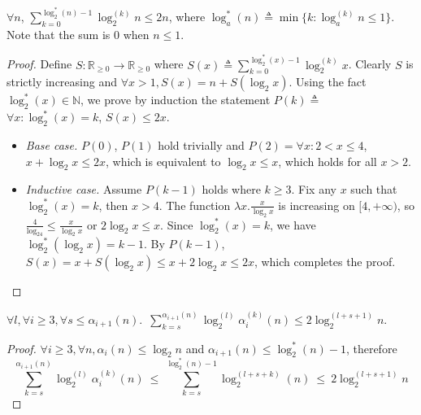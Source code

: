 \begin{lem}
	$\forall n$, $\displaystyle \sum_{k = 0}^{\log_2^*(n) - 1}\log_2^{(k)}n \le 2n$, where $\log_a^*(n) \triangleq \min\{k : \log_a^{(k)}n \le 1\}$. Note that the sum is $0$ when $n\le 1$.
\end{lem}
\begin{proof}
	Define $S: \mathbb{R}_{\ge 0}\to \mathbb{R}_{\ge 0}$ where $S(x) \triangleq \sum_{k = 0}^{\log_2^*(x) - 1}\log_2^{(k)}x$. Clearly $S$ is strictly increasing and $\forall x>1, S(x) = n + S(\log_2 x)$. Using the fact $\log_2^*(x)\in \mathbb{N}$, we prove by induction the statement $P(k) \triangleq$ $\forall x: \log_2^*(x) = k$, $S(x)\le 2x$.
	\begin{itemize}
		\item \emph{Base case.} $P(0)$, $P(1)$ hold trivially and $P(2) = \forall x: 2 < x \le 4$, $x + \log_2x \le 2x$, which is equivalent to $\log_2x \le x$, which holds for all $x > 2$.
		
		\item \emph{Inductive case.} Assume $P(k-1)$ holds where $k\ge 3$. Fix any $x$ such that $\log_2^*(x)=k$, then $x > 4$. The function $\lambda x.\frac{x}{\log_2x}$ is increasing on $[4, +\infty)$, so $\frac{4}{\log_24} \le \frac{x}{\log_2x}$ or $2\log_2x \le x$. Since $\log_2^*(x) = k$, we have $\log_2^*(\log_2x) = k-1$. By $P(k-1)$, $S(x) = x + S(\log_2x) \le x + 2\log_2x \le 2x$, which completes the proof.
	\end{itemize}
\end{proof}
\begin{lem} \label{lem: sum-alpha-repeat}
	$\forall l, \forall i \ge 3, \forall s\le \alpha_{i+1}(n)$.~$\displaystyle \sum_{k=s}^{\alpha_{i+1}(n)} \log_2^{(l)}\alpha_i^{(k)}(n) \le 2\log_2^{(l+s+1)}n$.
\end{lem}
\begin{proof}
  $\forall i\ge 3, \forall n, \alpha_i(n)\le \log_2n$ and $\alpha_{i+1}(n)\le \log_2^*(n)-1$, therefore
	\begin{equation*}
	\sum_{k=s}^{\alpha_{i+1}(n)} \log_2^{(l)}\alpha_i^{(k)}(n) \ \le \
	\sum_{k=s}^{\log_2^*(n)-1} \log_2^{(l+s+k)}(n) \ \le \
	2\log_2^{(l+s+1)} n
	\end{equation*}
\end{proof}
